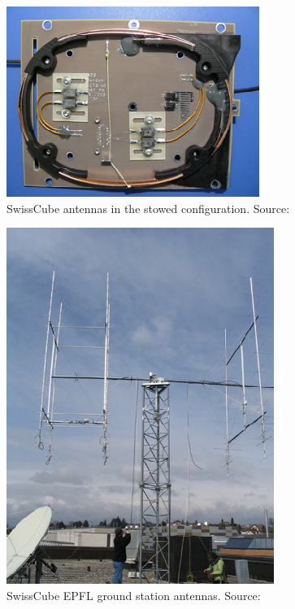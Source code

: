 \begin{minipage}{\linewidth}
    \centering
    \begin{minipage}{0.45\linewidth}
        \begin{figure}[H]
            \centering
            \includegraphics[width=0.32\paperwidth]{img/2/swisscube_stowed.png}
            \caption{SwissCube antennas in the stowed configuration. Source: \cite{swisscube_stowed}}
            \label{swisscube_stowed}
        \end{figure}
    \end{minipage}
    \hspace{0.05\linewidth}
    \begin{minipage}{0.45\linewidth}
        \begin{figure}[H]
            \centering
            \includegraphics[width=0.32\paperwidth]{img/2/swisscube_groundstation.png}
            \caption{SwissCube EPFL ground station antennas. Source: \cite{swisscube_groundstation}}
            \label{PW-swisscube_groundstation}
        \end{figure}
    \end{minipage}
\end{minipage}